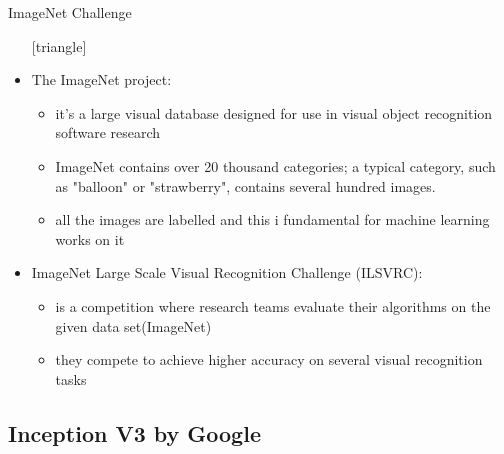 \documentclass{beamer}
\begin{document}
\begin{frame}{ImageNet Challenge}
	\begin{itemize}
		\setlength\itemsep{1em}
		[triangle]
		\item 
			The ImageNet project:
			\begin{itemize}
				[circle]
				\item 
					it's a large visual database designed for use in visual object recognition software research
				\item 
					ImageNet contains over 20 thousand categories; a typical category, such as "balloon" or 							"strawberry", contains several hundred images.
				\item
					all the images are labelled and this i fundamental for machine learning works on it
			\end{itemize}
		\item 
			ImageNet Large Scale Visual Recognition Challenge (ILSVRC):
			\begin{itemize}
				[circle]
				\item 
					is a competition where research teams evaluate their algorithms on the given data								set(ImageNet)
				\item 
					they compete to achieve higher accuracy on several visual recognition tasks
			\end{itemize}
	\end{itemize}
\end{frame}

\subsection{Inception V3 by Google}
\end{document}
